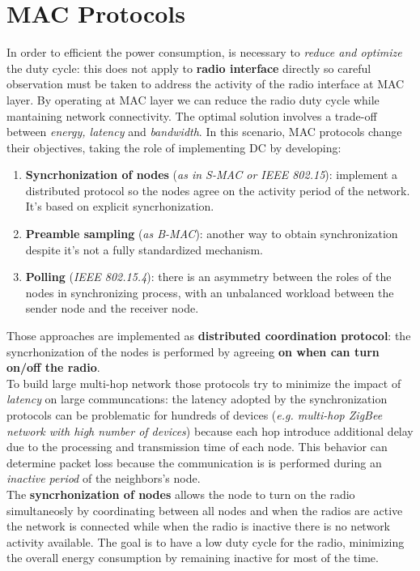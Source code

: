 \documentclass[10pt,a4paper]{report}
\theoremstyle{definition}
\begin{document}
\chapter{MAC Protocols}\label{sec:mac-protocols}
In order to efficient the power consumption, is necessary to \textit{reduce and optimize} the duty cycle: this does not apply to \textbf{radio interface} directly so careful observation must be taken to address the activity of the radio interface at MAC layer. By operating at MAC layer we can reduce the radio duty cycle while mantaining network connectivity.
The optimal solution involves a trade-off between \textit{energy, latency} and \textit{bandwidth}.
In this scenario, MAC protocols change their objectives, taking the role of implementing DC by developing:
\begin{enumerate}
	\item 
	\textbf{Syncrhonization of nodes} (\textit{as in S-MAC or IEEE 802.15}): implement a distributed protocol so the nodes agree on the activity period of the network. It's based on explicit syncrhonization.
	\item 
	\textbf{Preamble sampling} (\textit{as B-MAC}): another way to obtain synchronization despite it's not a fully standardized mechanism.
	\item 
	\textbf{Polling} (\textit{IEEE 802.15.4}): there is an asymmetry between the roles of the nodes in synchronizing process, with an unbalanced workload between the sender node and the receiver node.
\end{enumerate}

Those approaches are implemented as \textbf{distributed coordination protocol}: the syncrhonization of the nodes is performed by agreeing \textbf{on when can turn on/off the radio}.\\
To build large multi-hop network those protocols try to minimize the impact of \textit{latency} on large communcations: the latency adopted by the synchronization protocols can be problematic for hundreds of devices (\textit{e.g. multi-hop ZigBee network with high number of devices}) because each hop introduce additional delay due to the processing and transmission time of each node. This behavior can determine packet loss because the communication is is performed during an \textit{inactive period} of the neighbors's node.\\
The \textbf{syncrhonization of nodes} allows the node to turn on the radio simultaneosly by coordinating between all nodes and when the radios are active the network is connected while when the radio is inactive there is no network activity available.
The goal is to have a low duty cycle for the radio, minimizing the overall energy consumption by remaining inactive for most of the time.
\end{document}
